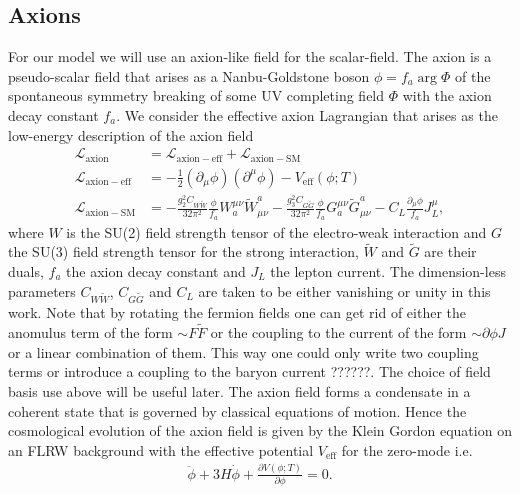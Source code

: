 \documentclass[13pt,a4paper,twoside,titlepage]{article}
\begin{document}
\subsection{Axions}
\label{sec:axions}

For our model we will use an axion-like field for the scalar-field.
The axion is a pseudo-scalar field that arises as a Nanbu-Goldstone boson $\phi = f_a \arg \Phi$ of the spontaneous symmetry breaking of some UV completing field $\Phi$ with the axion decay constant $f_a$.
We consider the effective axion Lagrangian that arises as the low-energy description of the axion field \cite[sec. 2.5]{Di_Luzio_2020_Landscape_of_QCD_Axion_models}
\begin{align}
    \mathcal{L}_{\mathrm{axion}} &= \mathcal{L}_{\mathrm{axion-eff}} + \mathcal{L}_{\mathrm{axion-SM}} \\
    \mathcal{L}_{\mathrm{axion-eff}} &= - \frac{1}{2} (\partial_\mu \phi) (\partial^\mu \phi) - V_\mathrm{eff}(\phi; T) \\
    \mathcal{L}_{\mathrm{axion-SM}} &=
        - \frac{g_2^2 C_{W\tilde{W}}}{32 \pi^2} \frac{\phi}{f_a} W_a^{\mu \nu}\tilde{W}^a_{\mu \nu}
        - \frac{g_3^2 C_{G\tilde{G}}}{32 \pi^2} \frac{\phi}{f_a} G_a^{\mu \nu}\tilde{G}^a_{\mu \nu}
        - C_{L} \frac{\partial_\mu \phi}{f_a} J^\mu_L,
\end{align}
where $W$ is the SU(2) field strength tensor of the electro-weak interaction and $G$ the SU(3) field strength tensor for the strong interaction, $\tilde{W}$ and $\tilde{G}$ are their duals, $f_a$ the axion decay constant and $J_L$ the lepton current.
The dimension-less parameters $C_{W\tilde{W}}$, $C_{G\tilde{G}}$ and $C_L$ are taken to be either vanishing or unity in this work.
Note that by rotating the fermion fields one can get rid of either the anomulus term of the form $\sim F \tilde{F}$ or the coupling to the current of the form $\sim \partial \phi J$
or a linear combination of them. This way one could only write two coupling terms or
introduce a coupling to the baryon current ??????. The choice of field basis use above will be useful later.
The axion field forms a condensate in a coherent state that is governed by classical
equations of motion. Hence the cosmological evolution of the axion field is given by
the Klein Gordon equation on an FLRW background \cite[chap. 1, 2]{the_early_universe_kolb_and_turner} with the effective potential $V_\mathrm{eff}$ for the zero-mode i.e. \cite[sec. 4.1, 4.2]{Axion_Cosmology_Marsh_2016}
\begin{align}
    \label{eq:axion_klein_gordon}
    \ddot{\phi} + 3 H \dot{\phi} + \frac{\partial V(\phi; T)}{\partial \phi} = 0.
\end{align}
\end{document}

